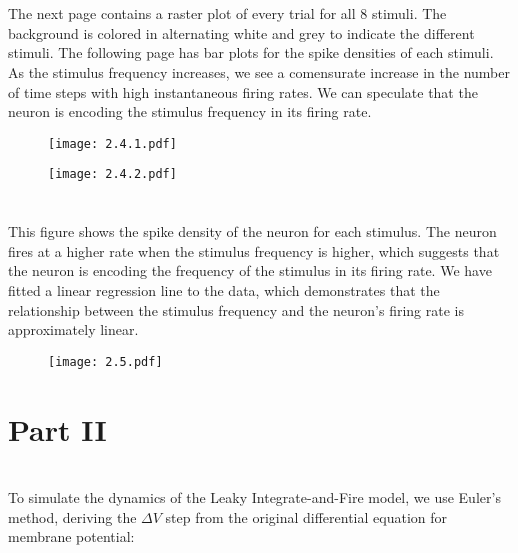 \documentclass{article}
\begin{document}
\section{}
The next page contains a raster plot of every trial for all 8 stimuli. The background is colored in alternating white and grey to indicate the different stimuli. The following page has bar plots for the spike densities of each stimuli. As the stimulus frequency increases, we see a comensurate increase in the number of time steps with high instantaneous firing rates. We can speculate that the neuron is encoding the stimulus frequency in its firing rate.

\begin{figure}[ht]
    \centering
    \texttt{[image: 2.4.1.pdf]}
    \vspace{-8pt}
\end{figure}

\begin{figure}[ht]
    \centering
    \texttt{[image: 2.4.2.pdf]}
    \vspace{-8pt}
\end{figure}


\FloatBarrier
\section{}
This figure shows the spike density of the neuron for each stimulus. The neuron fires at a higher rate when the stimulus frequency is higher, which suggests that the neuron is encoding the frequency of the stimulus in its firing rate. We have fitted a linear regression line to the data, which demonstrates that the relationship between the stimulus frequency and the neuron's firing rate is approximately linear.

\begin{figure}[ht]
    \centering
    \texttt{[image: 2.5.pdf]}
\end{figure}
\newpage

\section*{Part II}
\vspace{4px}

\setcounter{section}{0}
\renewcommand{\thesection}{1.\arabic{section}}

\section{}
To simulate the dynamics of the Leaky Integrate-and-Fire model, we use Euler's method, deriving the $\Delta V$ step from the original differential equation for membrane potential:
\end{document}
